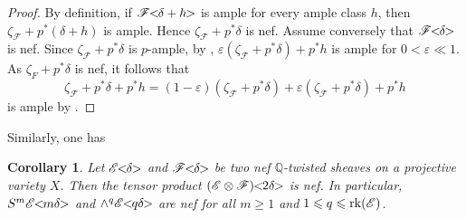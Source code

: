 \documentclass[english,reqno]{amsart}
\newcommand\bbQ{{\mathbb Q}}
\newcommand\sE{{\mathscr E}}
\newcommand\sF{{\mathscr F}}
\newcommand{\rk}{{\rm rk}}
\theoremstyle{plain}
\newtheorem{cor}[thm]{Corollary}
\theoremstyle{definition}
\numberwithin{equation}{section} %
\begin{document}
\begin{proof}
 By definition,   if $\sF\hspace{-0.8ex}<\hspace{-0.8ex}\delta+h\hspace{-0.8ex}>$ is ample for every ample class $h$, then  $\zeta_{\sF}+p^*(\delta+h)$ is ample. Hence  $\zeta_{\sF}+p^*\delta$   is nef.
  Assume conversely that $\sF\hspace{-0.8ex}<\hspace{-0.8ex}\delta\hspace{-0.8ex}>$ is nef. Since  $\zeta_{\sF}+p^*\delta$ is $p$-ample, by \cite[Proposition 4.4.10]{Grothendieck1961},  $\varepsilon(\zeta_{\sF}+p^*\delta)+p^*h$ is ample for  $0<\varepsilon \ll 1$. As $\zeta_F+p^*\delta$ is nef, it follows that
    \[\zeta_{\sF}+p^*\delta+p^*h=(1-\varepsilon)(\zeta_{\sF}+p^*\delta)+\varepsilon(\zeta_{\sF}+p^*\delta)+p^*h\]
    is ample by \cite[Corollary 1.4.10]{Lazarsfeld2004}.
\end{proof}

\noindent Similarly, one has
\begin{cor}\label{Symmetry-wedge}
    Let $\sE\hspace{-0.8ex}<\hspace{-0.8ex}\delta\hspace{-0.8ex}>$ and $\sF\hspace{-0.8ex}<\hspace{-0.8ex}\delta\hspace{-0.8ex}>$ be two nef $\bbQ$-twisted sheaves on a  projective variety $X$. Then the tensor product $(\sE\otimes \sF)\hspace{-0.8ex}<\hspace{-0.8ex}2\delta\hspace{-0.8ex}>$ is nef. In particular, $S^m\sE\hspace{-0.8ex}<\hspace{-0.8ex}m\delta\hspace{-0.8ex}>$ and $\wedge^q\sE\hspace{-0.8ex}<\hspace{-0.8ex}q\delta\hspace{-0.8ex}>$ are nef for all $m\geqslant 1$ and $1\leqslant q\leqslant \rk(\sE)$.
\end{cor}
\end{document}
